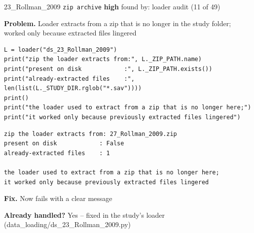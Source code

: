 \documentclass[9pt, t, handout]{beamer}
\newcommand{\ans}[1]{\textcolor{structure.fg}{#1}}
\begin{document}
\begin{frame}[fragile]{23\_Rollman\_2009 \quad \texttt{zip archive}}
  {\scriptsize\textcolor{orange!80!black}{\textbf{high}} \quad
   found by: loader audit \quad (11 of 49)}
  \vspace{3pt}

  {\footnotesize \textbf{Problem.} Loader extracts from a zip that is no longer in the study folder; worked only because extracted files lingered}
  \vspace{4pt}

  \begin{Verbatim}[fontsize=\tiny, frame=single, framesep=2pt, label=\tiny reproduce]
L = loader("ds_23_Rollman_2009")
print("zip the loader extracts from:", L._ZIP_PATH.name)
print("present on disk            :", L._ZIP_PATH.exists())
print("already-extracted files    :", len(list(L._STUDY_DIR.rglob("*.sav"))))
print()
print("the loader used to extract from a zip that is no longer here;")
print("it worked only because previously extracted files lingered")
  \end{Verbatim}
  \begin{Verbatim}[fontsize=\tiny, frame=single, framesep=2pt, label=\tiny output]
zip the loader extracts from: 27_Rollman_2009.zip
present on disk            : False
already-extracted files    : 1

the loader used to extract from a zip that is no longer here;
it worked only because previously extracted files lingered
  \end{Verbatim}
  \vspace{2pt}

  {\footnotesize \textbf{Fix.} Now fails with a clear message}
  \vspace{2pt}

  {\footnotesize \textbf{Already handled?} \ans{Yes} -- fixed in the study's loader
   (data\_loading/ds\_23\_Rollman\_2009.py)}
\end{frame}
\end{document}
